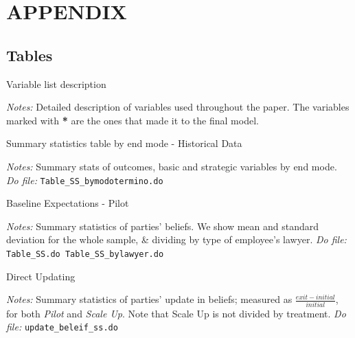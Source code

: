 \documentclass[11pt]{article}
\begin{document}


\section{APPENDIX}

\subsection{Tables}



\begin{table}[H]
    \caption{Variable list description }
    \label{tab:SS}
    \begin{center}
        \scriptsize{}
    \end{center}
    \footnotesize
    \textit{Notes:} 
Detailed description of variables used throughout the paper. The variables marked with \textbf{*} are the ones that made it to the final model.
\end{table}

\begin{table}[H]
    \caption{Summary statistics table by end mode - Historical Data}
    \label{tab:SS}
    \begin{center}
        \tiny{}
    \end{center}
    \footnotesize
    \textit{Notes:} 
Summary stats of outcomes, basic and strategic variables by end mode.
    \textit{Do file: } \texttt{Table\_SS\_bymodotermino.do}
\end{table}

\begin{table}[H]
    \caption{Baseline Expectations - Pilot}
    \label{Table_expectations}
    \begin{center}
       \scriptsize{}
    \end{center}
    \footnotesize    
    \textit{Notes:} 
    Summary statistics of parties' beliefs. We show mean and standard deviation for the whole sample, \& dividing by type of employee's lawyer.
    \textit{Do file: } \texttt{Table\_SS.do  Table\_SS\_bylawyer.do}
\end{table}



    
\begin{table}[H]
    \caption{Direct Updating}
     \begin{center}
       \scriptsize{}
    \end{center}
           \footnotesize    
  \textit{Notes:} 
    Summary statistics of parties' update in beliefs; measured as $\frac{exit-initial}{initial}$, for both \emph{Pilot} and \emph{Scale Up}. Note that Scale Up is not divided by treatment. 
    \textit{Do file: } \texttt{update\_beleif\_ss.do}
\end{table}
\end{document}
